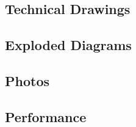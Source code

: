 \documentclass[11pt]{article}
\begin{document}
\subsection{Technical Drawings}
\label{sec:orgbdc7252}

\subsection{Exploded Diagrams}
\label{sec:org9348821}

\subsection{Photos}
\label{sec:orgb6f5bb7}

\subsection{Performance}
\label{sec:org90bc470}
\end{document}

